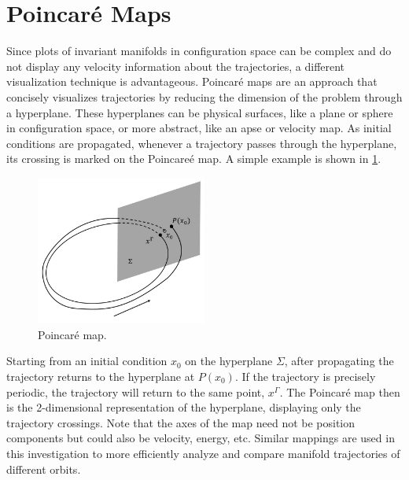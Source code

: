 \section{Poincar\'e Maps}
Since plots of invariant manifolds in configuration space can be complex and do not display any
velocity information about the trajectories, a different visualization technique is advantageous.
Poincar\'e maps are an approach that concisely visualizes trajectories by reducing the dimension of
the problem through a hyperplane. These hyperplanes can be physical surfaces, like a plane or
sphere in configuration space, or more abstract, like an apse or velocity map. As initial
conditions are propagated, whenever a trajectory passes through the hyperplane, its crossing is
marked on the Poincare\'e map. A simple example is shown in \cref{fig:map}.

\begin{figure}[ht]
    \centering
    \includegraphics[width=0.5\textwidth]{figures/Map.jpg}
    \caption{Poincar\'e map.}
    \label{fig:map}
\end{figure}

Starting from an initial condition $x_{0}$ on the hyperplane $\Sigma$, after propagating the
trajectory returns to the hyperplane at $P(x_{0})$. If the trajectory is precisely periodic, the
trajectory will return to the same point, $x^{\Gamma}$. The Poincar\'e map then is the
2-dimensional representation of the hyperplane, displaying only the trajectory crossings. Note that
the axes of the map need not be position components but could also be velocity, energy, etc.
Similar mappings are used in this investigation to more efficiently analyze and compare manifold
trajectories of different orbits.
